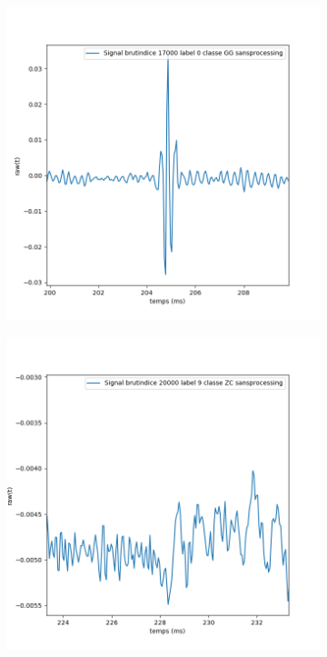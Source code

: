 \begin{figure}[!h]
  \centering
  \begin{subfigure}[b]{0.3\textwidth}
    \includegraphics[width=\textwidth]{./images/indice17000Spectro1Dlabel0classeGGsansprocessingaveczoom.png}
  \end{subfigure}
  \begin{subfigure}[b]{0.3\textwidth}
    \includegraphics[width=\textwidth]{./images/indice20000Spectro1Dlabel9classeZCsansprocessingaveczoom.png}

\end{subfigure}
\end{figure}
